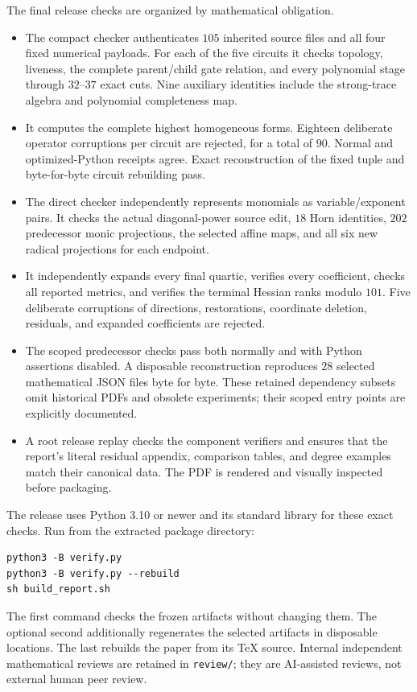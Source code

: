 The final release checks are organized by mathematical obligation.
\begin{itemize}
\item The compact checker authenticates $105$ inherited source files and
all four fixed numerical payloads. For each of the five circuits it checks
topology, liveness, the complete parent/child gate relation, and every
polynomial stage through $32$--$37$ exact cuts. Nine auxiliary identities
include the strong-trace algebra and polynomial completeness map.
\item It computes the complete highest homogeneous forms. Eighteen
deliberate operator corruptions per circuit are rejected, for a total of
$90$. Normal and optimized-Python receipts agree. Exact reconstruction
of the fixed tuple and byte-for-byte circuit rebuilding pass.
\item The direct checker independently represents monomials as
variable/exponent pairs. It checks the actual diagonal-power source edit,
$18$ Horn identities, $202$ predecessor monic projections, the selected
affine maps, and all six new radical projections for each endpoint.
\item It independently expands every final quartic, verifies every
coefficient, checks all reported metrics, and verifies the terminal
Hessian ranks modulo $101$. Five deliberate corruptions of directions,
restorations, coordinate deletion, residuals, and expanded coefficients
are rejected.
\item The scoped predecessor checks pass both normally and with Python
assertions disabled. A disposable reconstruction reproduces $28$
selected mathematical JSON files byte for byte. These retained
dependency subsets omit historical PDFs and obsolete experiments;
their scoped entry points are explicitly documented.
\item A root release replay checks the component verifiers and ensures
that the report's literal residual appendix, comparison tables, and
degree examples match their canonical data. The PDF is rendered and
visually inspected before packaging.
\end{itemize}

The release uses Python 3.10 or newer and its standard library for
these exact checks. Run from the extracted package directory:
\begin{verbatim}
python3 -B verify.py
python3 -B verify.py --rebuild
sh build_report.sh
\end{verbatim}
The first command checks the frozen artifacts without changing them.
The optional second additionally regenerates the selected artifacts
in disposable locations. The last rebuilds the paper from its TeX
source. Internal independent mathematical reviews are retained in
\texttt{review/}; they are AI-assisted reviews, not external human
peer review.
